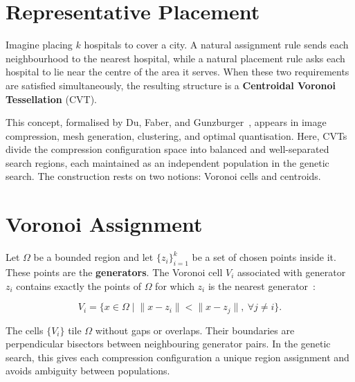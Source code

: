 \documentclass[10pt,twocolumn]{article}
\begin{document}
\appendix
{}

\section{Representative Placement}
Imagine placing $k$ hospitals to cover a city. A natural assignment rule sends each neighbourhood to the nearest hospital, while a natural placement rule asks each hospital to lie near the centre of the area it serves. When these two requirements are satisfied simultaneously, the resulting structure is a \textbf{Centroidal Voronoi Tessellation} (CVT).

This concept, formalised by Du, Faber, and Gunzburger~\cite{du1999cvt}, appears in image compression, mesh generation, clustering, and optimal quantisation. Here, CVTs divide the compression configuration space into balanced and well-separated search regions, each maintained as an independent population in the genetic search. The construction rests on two notions: Voronoi cells and centroids.

\section{Voronoi Assignment}
Let $\Omega$ be a bounded region and let $\{z_i\}_{i=1}^k$ be a set of chosen points inside it. These points are the \textbf{generators}. The Voronoi cell $V_i$ associated with generator $z_i$ contains exactly the points of $\Omega$ for which $z_i$ is the nearest generator~\cite{mount2002geom}:
\begin{tcolorbox}[cvtbox]
\[
V_i=\{x\in\Omega\mid \lVert x-z_i\rVert < \lVert x-z_j\rVert,\ \forall j\ne i\}.
\]
\end{tcolorbox}
The cells $\{V_i\}$ tile $\Omega$ without gaps or overlaps. Their boundaries are perpendicular bisectors between neighbouring generator pairs. In the genetic search, this gives each compression configuration a unique region assignment and avoids ambiguity between populations.
\end{document}
